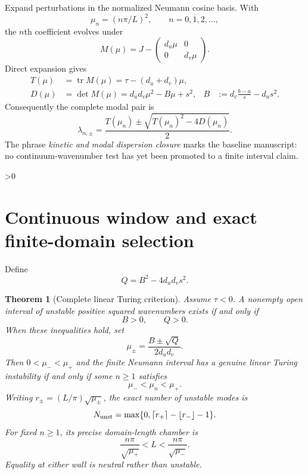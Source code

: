 \documentclass[10pt]{article}
\providecommand{\CRevisionRound}{2}
\newtheorem{theorem}{Theorem}
\begin{document}
Expand perturbations in the normalized Neumann cosine basis.  With
\begin{equation}\label{eq:mu}
 \mu_n=(n\pi/L)^2,\qquad n=0,1,2,\ldots,
\end{equation}
the $n$th coefficient evolves under
\begin{equation}\label{eq:M}
 M(\mu)=J-\begin{pmatrix}d_u\mu&0\\0&d_v\mu\end{pmatrix}.
\end{equation}
Direct expansion gives
\begin{align}
 T(\mu)&=\operatorname{tr}M(\mu)=\tau-(d_u+d_v)\mu,\label{eq:T}\\
 D(\mu)&=\det M(\mu)=d_ud_v\mu^2-B\mu+s^2,
 &B&:=d_v\frac{b-a}{s}-d_us^2.\label{eq:D}
\end{align}
Consequently the complete modal pair is
\begin{equation}\label{eq:lambdas}
 \lambda_{n,\pm}=\frac{T(\mu_n)\pm
 \sqrt{T(\mu_n)^2-4D(\mu_n)}}{2}.
\end{equation}
The phrase \emph{kinetic and modal dispersion closure} marks the baseline
manuscript: no continuum-wavenumber test has yet been promoted to a finite
interval claim.

\ifnum\CRevisionRound>0
\section{Continuous window and exact finite-domain selection}
Define
\begin{equation}\label{eq:Q}
 Q=B^2-4d_ud_vs^2.
\end{equation}
\begin{theorem}[Complete linear Turing criterion]\label{thm:turing}
Assume $\tau<0$.  A nonempty open interval of unstable positive squared
wavenumbers exists if and only if
\begin{equation}\label{eq:windowcond}
 B>0,\qquad Q>0.
\end{equation}
When these inequalities hold, set
\begin{equation}\label{eq:roots}
 \mu_\pm=\frac{B\pm\sqrt Q}{2d_ud_v}.
\end{equation}
Then $0<\mu_-<\mu_+$ and the finite Neumann interval has a genuine linear
Turing instability if and only if some $n\geq1$ satisfies
\begin{equation}\label{eq:strictmode}
 \mu_-<\mu_n<\mu_+.
\end{equation}
Writing $r_\pm=(L/\pi)\sqrt{\mu_\pm}$, the exact number of unstable modes is
\begin{equation}\label{eq:count}
 N_{\rm unst}=\max\{0,\lceil r_+\rceil-\lfloor r_-\rfloor-1\}.
\end{equation}
For fixed $n\geq1$, its precise domain-length chamber is
\begin{equation}\label{eq:length}
 \frac{n\pi}{\sqrt{\mu_+}}<L<\frac{n\pi}{\sqrt{\mu_-}}.
\end{equation}
Equality at either wall is neutral rather than unstable.
\end{theorem}
\end{document}
